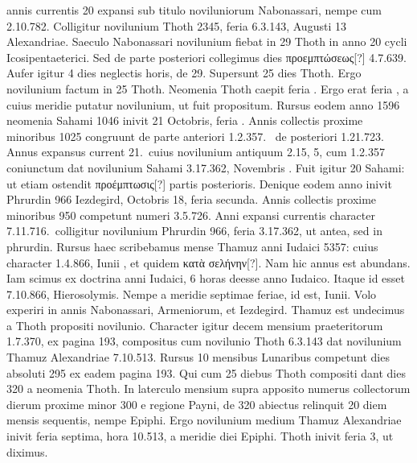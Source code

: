 annis currentis 20 expansi sub
titulo noviluniorum Nabonassari, nempe cum 2.10.782.
Colligitur
novilunium Thoth 2345, feria 6.3.143, Augusti 13 Alexandriae.
Saeculo Nabonassari novilunium fiebat in 29 Thoth in anno 20
cycli Icosipentaeterici.
Sed de parte posteriori collegimus dies \textgreek{προεμπτώσεως}[?]
4.7.639.
Aufer igitur 4 dies neglectis horis, de 29.
Supersunt 25 dies Thoth.
Ergo novilunium factum in 25 Thoth.
Neomenia Thoth caepit feria .
Ergo  erat feria , a cuius
meridie putatur novilunium, ut fuit propositum.
Rursus eodem anno
1596 neomenia Sahami 1046 inivit 21 Octobris, feria .
Annis
collectis proxime minoribus 1025 congruunt de parte anteriori 1.2.357.\ %
de posteriori 1.21.723.
Annus expansus current 21.\ cuius novilunium
antiquum 2.15, 5, cum 1.2.357 coniunctum dat novilunium
Sahami 3.17.362, Novembris .
Fuit igitur 20 Sahami: ut
etiam ostendit \textgreek{προέμπτωσις}[?] partis posterioris.
Denique eodem anno
inivit Phrurdin 966 Iezdegird, Octobris 18, feria secunda.
Annis
collectis proxime minoribus 950 competunt numeri 3.5.726.
Anni
expansi currentis character 7.11.716.\ colligitur novilunium Phrurdin
966, feria 3.17.362, ut antea, sed in  phrurdin.
Rursus
haec scribebamus mense Thamuz anni Iudaici 5357: cuius character
1.4.866, Iunii , et quidem \textgreek{κατὰ σελήνην}[?].
Nam hic annus
est abundans.
Iam scimus ex doctrina anni Iudaici, 6 horas deesse
anno Iudaico.
Itaque id esset 7.10.866, Hierosolymis.
Nempe a
meridie septimae feriae, id est,  Iunii.
Volo experiri in annis Nabonassari,
Armeniorum, et Iezdegird.
%
Thamuz est undecimus a Thoth
propositi novilunio.
Character igitur decem mensium praeteritorum
1.7.370, ex pagina 193, compositus cum novilunio Thoth 6.3.143
dat novilunium Thamuz Alexandriae 7.10.513.
Rursus 10 mensibus
Lunaribus competunt dies absoluti 295 ex eadem pagina 193.
Qui
cum 25 diebus Thoth compositi dant dies 320 a neomenia Thoth.
%
In laterculo mensium supra apposito numerus collectorum dierum
proxime minor 300 e regione Payni, de 320 abiectus relinquit 20
diem mensis sequentis, nempe Epiphi.
Ergo novilunium medium
Thamuz Alexandriae inivit feria septima, hora 10.513, a meridie 
diei Epiphi.
Thoth inivit feria 3, ut diximus.
